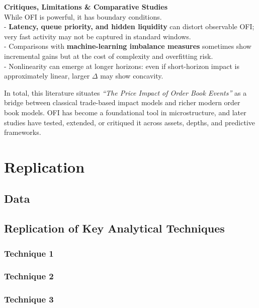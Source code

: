 \documentclass{article}
\begin{document}
\textbf{Critiques, Limitations \& Comparative Studies}\\
While OFI is powerful, it has boundary conditions.\\
- \textbf{Latency, queue priority, and hidden liquidity} can distort
observable OFI; very fast activity may not be captured in standard
windows.\\
- Comparisons with \textbf{machine-learning imbalance measures}
sometimes show incremental gains but at the cost of complexity and
overfitting risk.\\
- Nonlinearity can emerge at longer horizons: even if short-horizon
impact is approximately linear, larger \(\Delta\) may show concavity.

In total, this literature situates \emph{``The Price Impact of Order
Book Events''} as a bridge between classical trade-based impact models
and richer modern order book models. OFI has become a foundational tool
in microstructure, and later studies have tested, extended, or critiqued
it across assets, depths, and predictive frameworks.

\section{Replication}\label{replication}

\subsection{Data}\label{data}

\subsection{Replication of Key Analytical
Techniques}\label{replication-of-key-analytical-techniques}

\subsubsection{Technique 1}\label{technique-1}

\subsubsection{Technique 2}\label{technique-2}

\subsubsection{Technique 3}\label{technique-3}
\end{document}
